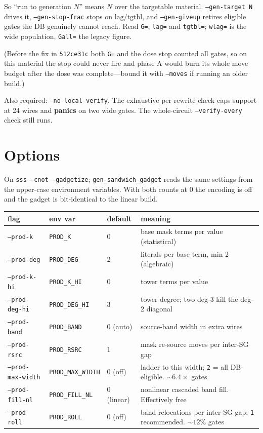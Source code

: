 \documentclass[11pt]{article}
\begin{document}
So ``run to generation $N$'' means $N$ over the targetable material.
\texttt{--gen-target N} drives it, \texttt{--gen-stop-frac} stops on
$\mathrm{lag}/\mathrm{tgtbl}$, and \texttt{--gen-giveup} retires eligible gates
the DB genuinely cannot reach. Read \texttt{G=}, \texttt{lag=} and
\texttt{tgtbl=}; \texttt{wlag=} is the wide population, \texttt{Gall=} the
legacy figure.

(Before the fix in \texttt{512ce31c} both \texttt{G=} and the dose stop counted
all gates, so on this material the stop could never fire and phase A would burn
its whole move budget after the dose was complete---bound it with
\texttt{--moves} if running an older build.)

Also required: \texttt{--no-local-verify}. The exhaustive per-rewrite check caps
support at 24 wires and \textbf{panics} on two wide gates. The whole-circuit
\texttt{--verify-every} check still runs.

\section{Options}

On \texttt{sss --cnot --gadgetize}; \texttt{gen\_sandwich\_gadget} reads the same
settings from the upper-case environment variables. With both counts at 0 the
encoding is off and the gadget is bit-identical to the linear build.

\begin{center}
\begin{tabular}{llll}
\toprule
flag & env var & default & meaning \\
\midrule
\texttt{--prod-k} & \texttt{PROD\_K} & 0 & base mask terms per value (statistical) \\
\texttt{--prod-deg} & \texttt{PROD\_DEG} & 2 & literals per base term, min 2 (algebraic) \\
\texttt{--prod-k-hi} & \texttt{PROD\_K\_HI} & 0 & tower terms per value \\
\texttt{--prod-deg-hi} & \texttt{PROD\_DEG\_HI} & 3 & tower degree; two deg-3 kill the deg-2 diagonal \\
\texttt{--prod-band} & \texttt{PROD\_BAND} & 0 (auto) & source-band width in extra wires \\
\texttt{--prod-rsrc} & \texttt{PROD\_RSRC} & 1 & mask re-source moves per inter-SG gap \\
\texttt{--prod-max-width} & \texttt{PROD\_MAX\_WIDTH} & 0 (off) & ladder to this width; \texttt{2} = all DB-eligible. ${\sim}6.4\times$ gates \\
\texttt{--prod-fill-nl} & \texttt{PROD\_FILL\_NL} & 0 (linear) & nonlinear cascaded band fill. Effectively free \\
\texttt{--prod-roll} & \texttt{PROD\_ROLL} & 0 (off) & band relocations per inter-SG gap; \texttt{1} recommended. ${\sim}12\%$ gates \\
\bottomrule
\end{tabular}
\end{center}
\end{document}
